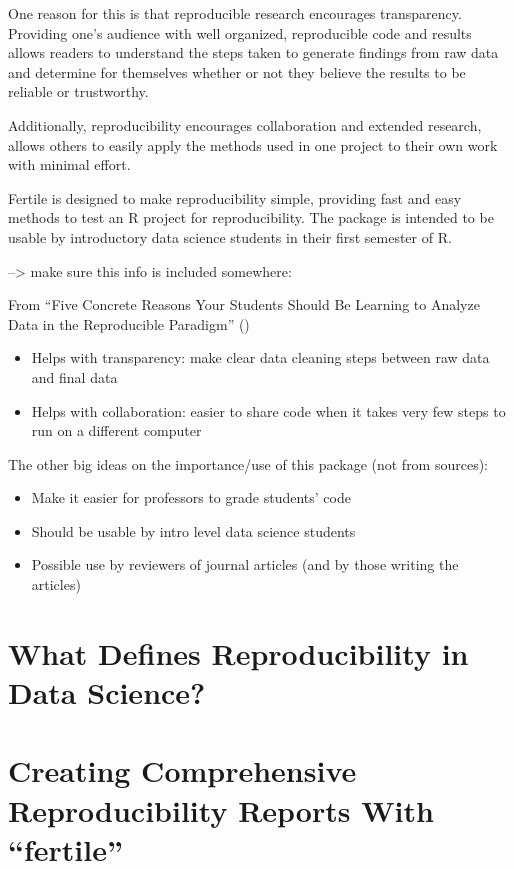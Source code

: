 \documentclass[12pt]{article}
\providecommand{\tightlist}{%
  \setlength{\itemsep}{0pt}\setlength{\parskip}{0pt}}
\begin{document}
One reason for this is that reproducible research encourages
transparency. Providing one's audience with well organized, reproducible
code and results allows readers to understand the steps taken to
generate findings from raw data and determine for themselves whether or
not they believe the results to be reliable or trustworthy.

Additionally, reproducibility encourages collaboration and extended
research, allows others to easily apply the methods used in one project
to their own work with minimal effort. \citet{bray2014five}

Fertile is designed to make reproducibility simple, providing fast and
easy methods to test an R project for reproducibility. The package is
intended to be usable by introductory data science students in their
first semester of R.

--\textgreater{} make sure this info is included somewhere:

From ``Five Concrete Reasons Your Students Should Be Learning to Analyze
Data in the Reproducible Paradigm'' (\citet{bray2014five})

\begin{itemize}
\tightlist
\item
  Helps with transparency: make clear data cleaning steps between raw
  data and final data
\item
  Helps with collaboration: easier to share code when it takes very few
  steps to run on a different computer
\end{itemize}

The other big ideas on the importance/use of this package (not from
sources):

\begin{itemize}
\tightlist
\item
  Make it easier for professors to grade students' code
\item
  Should be usable by intro level data science students
\item
  Possible use by reviewers of journal articles (and by those writing
  the articles)
\end{itemize}

\section{What Defines Reproducibility in Data
Science?}\label{what-defines-reproducibility-in-data-science}

\section{\texorpdfstring{Creating Comprehensive Reproducibility Reports
With
``fertile''}{Creating Comprehensive Reproducibility Reports With fertile}}\label{creating-comprehensive-reproducibility-reports-with-fertile}
\end{document}
